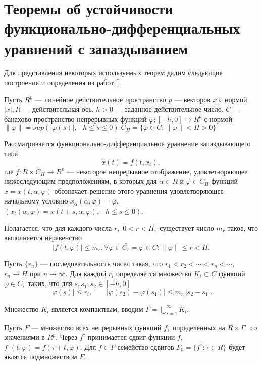 \section{Теоремы об устойчивости функционально-дифференциальных уравнений с запаздыванием} \label{p11}

	
	Для представления некоторых используемых теорем дадим следующие построения и определения из работ [].

	Пусть $R^p$ --- линейное действительное пространство $p$ --- векторов $x$ с нормой $|x|,  R$ 
	--- действительная ось, $h>0$ --- заданное действительное число, $C$ --- банахово пространство
	непрерывных функций $\varphi:[-h,0] \rightarrow R^p$ с нормой $\|\varphi\|=sup(|\varphi(s)|,-h \le s \le 0). C_H = \{\varphi \in C : \| \varphi \| < H > 0\}$
	
	Рассматривается функционально-дифференциальное
	уравнение запаздывающего типа
	\begin{equation}
	\dot x(t) = f(t,x_t), \label{1.1'}
	\end{equation}
	где $f: R \times C_{H}\to R^p$ --- некоторое непрерывное отображение,
	удовлетворяющее  нижеследующим предположениям, в которых для $\alpha \in R$ и $\varphi \in C_H$ функций $x = x(t, \alpha, \varphi)$ обозначает решение этого уравнения удовлетворяющее начальному условию $x_{\alpha} (\alpha, \varphi) = \varphi,$ $(x_{t} (\alpha, \varphi) = x (t + s, \alpha, \varphi), -h \le s \le 0)$.
	
	Полагается, что для каждого  числа $r,$ $0<r<H,$ существует число $m_r$ такое, что выполняется неравенство
		\begin{equation}\label{1.2'}
		\left| f(t, \varphi) \right|\le m_r, \forall \varphi \in \bar{C_r} = {\varphi \in C: \| \varphi \| \le r < H}.
		\end{equation}
	
	Пусть $\{r_n\}$ ---
	последовательность чисел такая, что $r_1<r_2<\cdots <r_n<\cdots, $
	$r_n\to H$ при $n\to \infty .$ Для каждой $r_i$ определяется
	множество $K_i\subset C$ функций $\varphi \in C,$ таких, что
	для $s, s_1,s_2 \in [-h,0]$  $$|\varphi (s)|\le r_i, \qquad
	|\varphi (s_2)-\varphi (s_1)|\le m_{r_i} |s_2-s_1|.$$
	
	Множество $K_i$ является компактным, вводим $\Gamma =\bigcup\limits_{i=1}^{\infty } {K_i}.$
	
	Пусть $F$ --- множество всех непрерывных функций $f,$
	определенных на $R \times \Gamma,$ со значениями в $R^p.$
	Через $f^{\tau }$ принимается сдвиг функции $f,$ $f^{\tau }(t,\varphi )=f(\tau +t,\varphi ).$
	Для $f\in F$ семейство сдвигов $F_0=\{f^{\tau }:\tau\in
	R\}$ будет являтся подмножеством $F.$
	

